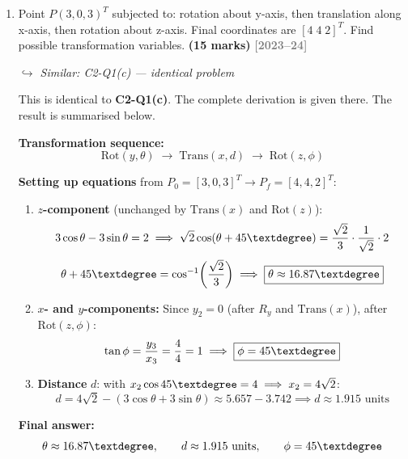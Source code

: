 \documentclass[12pt,a3paper]{article}
\newcommand{\yr}[1]{\hfill\textcolor{gray}{\small\textbf{[#1]}}}
\newcommand{\mk}[1]{\textcolor{orange!70!black}{\small\textbf{(#1 marks)}}}
\newcommand{\variant}[1]{\par\vspace{1pt}\textcolor{blue!50!black}%
  {\footnotesize\textit{$\hookrightarrow$ Similar: #1}}}
\begin{document}
\begin{enumerate}
\item \label{qlabel:C4-Q7}
Point $P(3,0,3)^T$ subjected to: rotation about y-axis, then
translation along x-axis, then rotation about z-axis. Final coordinates
are $[4\;4\;2]^T$. Find possible transformation variables. \mk{15}
\yr{2023--24}
\variant{C2-Q1(c) — identical problem}

\begin{tcolorbox}[enhanced,breakable,ansbox,colback=cD!4,colframe=cD,
  boxrule=0.8pt,arc=5pt,
  title={\textbf{Answer}},fonttitle=\bfseries\color{white},colbacktitle=cD]

This is identical to \textbf{C2-Q1(c)}. The complete derivation is
given there. The result is summarised below.

\medskip
\textbf{Transformation sequence:}
\[
  \mathrm{Rot}(y,\theta) \;\to\; \mathrm{Trans}(x,d) \;\to\; \mathrm{Rot}(z,\phi)
\]

\textbf{Setting up equations} from $P_0=[3,0,3]^T \to P_f=[4,4,2]^T$:

\begin{enumerate}[label=\textbf{\roman*.}]
  \item \textbf{$z$-component} (unchanged by $\mathrm{Trans}(x)$ and
    $\mathrm{Rot}(z)$):
    \[
      3\cos\theta - 3\sin\theta = 2
      \implies \sqrt{2}\cos(\theta+45\textdegree) = \frac{\sqrt{2}}{3}
      \cdot\frac{1}{\sqrt{2}} \cdot 2
    \]
    \[
      \theta + 45\textdegree = \cos^{-1}\!\left(\frac{\sqrt{2}}{3}\right)
      \implies \boxed{\theta \approx 16.87\textdegree}
    \]

  \item \textbf{$x$- and $y$-components:} Since $y_2=0$ (after
    $R_y$ and $\mathrm{Trans}(x)$), after $\mathrm{Rot}(z,\phi)$:
    \[
      \tan\phi = \frac{y_3}{x_3} = \frac{4}{4} = 1
      \implies \boxed{\phi = 45\textdegree}
    \]

  \item \textbf{Distance} $d$: with $x_2\cos45\textdegree = 4 \implies
    x_2 = 4\sqrt{2}$:
    \[
      d = 4\sqrt{2} - (3\cos\theta + 3\sin\theta)
      \approx 5.657 - 3.742
      \implies \boxed{d \approx 1.915 \text{ units}}
    \]
\end{enumerate}

\textbf{Final answer:}
\[
  \theta \approx 16.87\textdegree, \qquad d \approx 1.915\text{ units},
  \qquad \phi = 45\textdegree
\]

\end{tcolorbox}


\end{enumerate}
\end{document}
